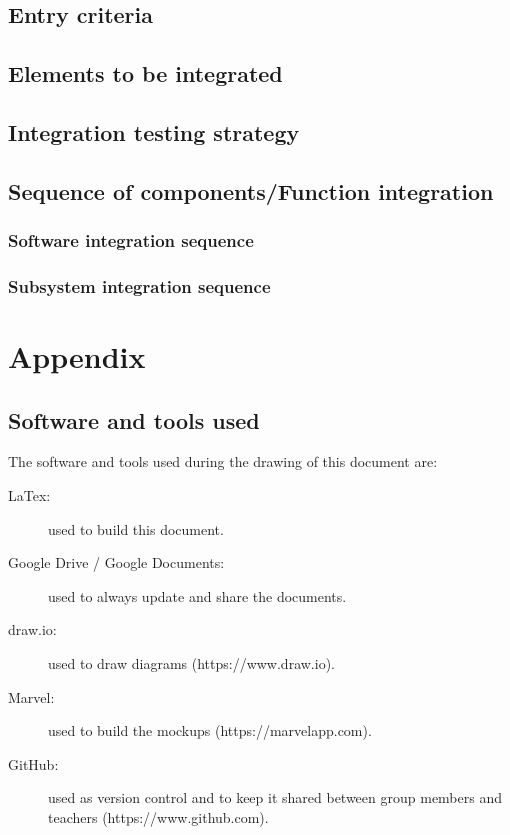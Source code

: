 \documentclass{article}
\begin{document}
	\subsection{Entry criteria}


	\subsection{Elements to be integrated}


	\subsection{Integration testing strategy}


	\subsection{Sequence of components/Function integration}


	\subsubsection{Software integration sequence}


	\subsubsection{Subsystem integration sequence}


	\newpage
	\appendix
	\section{Appendix}


	\subsection{Software and tools used}

	The software and tools used during the drawing of this document are:

	\begin{description}
	\item[LaTex:] used to build this document.
	\item[Google Drive / Google Documents:] used to always update and share the documents.
	\item[draw.io:] used to draw diagrams (https://www.draw.io).
	\item[Marvel:] used to build the mockups (https://marvelapp.com).
	\item[GitHub:] used as version control and to keep it shared between group members and teachers (https://www.github.com).
	\end{description}
	
\end{document}
